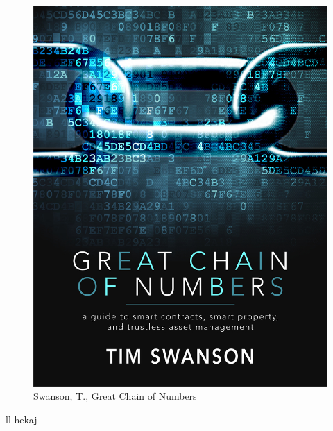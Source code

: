 \documentclass{beamer}
\begin{document}
\begin{frame}
    \begin{figure}
        \includegraphics[height=0.9\textheight]{tim_obl}
        \caption{Swanson, T., Great Chain of Numbers}
    \end{figure}
\end{frame}

\begin{frame}
    \begin{multicols}{2}
     ll   hekaj
        \columnbreak
    \end{multicols}
\end{frame}
\end{document}
